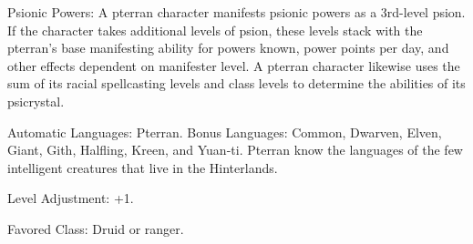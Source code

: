\begin{itemize*}
    \item Psionic Powers: A pterran character manifests psionic powers as a 3rd-level psion. If the character takes additional levels of psion, these levels stack with the pterran's base manifesting ability for powers known, power points per day, and other effects dependent on manifester level. A pterran character likewise uses the sum of its racial spellcasting levels and class levels to determine the abilities of its psicrystal.

    \item Automatic Languages: Pterran. Bonus Languages: Common, Dwarven, Elven, Giant, Gith, Halfling, Kreen, and Yuan-ti. Pterran know the languages of the few intelligent creatures that live in the Hinterlands.
    \item Level Adjustment: +1.
    \item Favored Class: Druid or ranger.
\end{itemize*}
